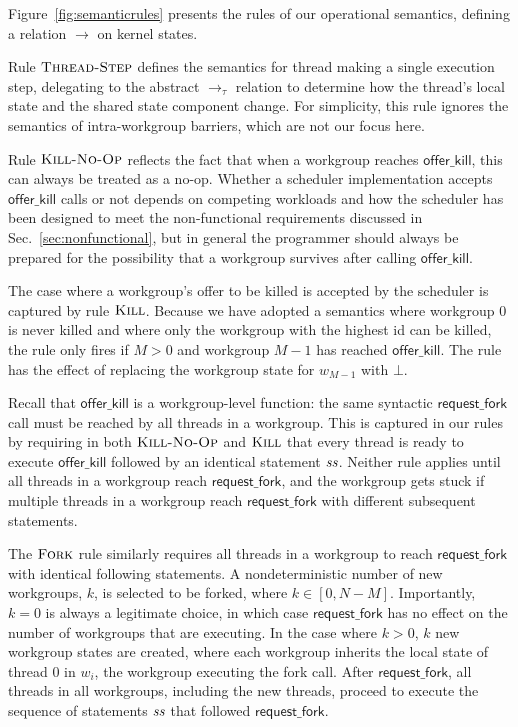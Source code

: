 \documentclass[parskip=half,sigconf,review, anonymous=true, acmcopyrightmode=none]{acmart}
\newcommand{\myfiglong}{Figure~}
\newcommand{\mysec}{Sec.~}
\newcommand{\offerfork}{\mathsf{request\_fork}}
\newcommand{\offerkill}{\mathsf{offer\_kill}}
\begin{document}
%
\myfiglong\ref{fig:semanticrules} presents the rules of our
operational semantics, defining a relation $\rightarrow$ on kernel
states.

Rule $\textsc{Thread-Step}$ defines the semantics for thread making a
single execution step, delegating to the abstract $\rightarrow_{\tau}$
relation to determine how the thread's local state and the shared
state component change.  For simplicity, this rule ignores the
semantics of intra-workgroup barriers, which are not our focus here.

Rule $\textsc{Kill-No-Op}$ reflects the fact that when a workgroup
reaches $\offerkill$, this can always be treated as a no-op.  Whether
a scheduler implementation accepts $\offerkill$ calls or not depends
on competing workloads and how the scheduler has been designed to meet
the non-functional requirements discussed in
\mysec\ref{sec:nonfunctional}, but in general the programmer should
always be prepared for the possibility that a workgroup survives after
calling $\offerkill$.

The case where a workgroup's offer to be killed is accepted by the
scheduler is captured by rule $\textsc{Kill}$.  Because we have
adopted a semantics where workgroup 0 is never killed and where only
the workgroup with the highest id can be killed, the rule only fires
if $M > 0$ and workgroup $M-1$ has reached $\offerkill$.  The rule has
the effect of replacing the workgroup state for $w_{M-1}$
with $\bot$.

Recall that $\offerkill$ is a workgroup-level function: the same
syntactic $\offerfork$ call must be reached by all threads in a
workgroup.  This is captured in our rules by requiring in both
$\textsc{Kill-No-Op}$ and $\textsc{Kill}$ that every thread is ready
to execute $\offerkill$ followed by an identical statement $\mathit{ss}$.
Neither rule applies until all threads in a workgroup reach
$\offerfork$, and the workgroup gets stuck if multiple threads in a
workgroup reach $\offerfork$ with different subsequent statements.

The $\textsc{Fork}$ rule similarly requires all threads in a workgroup
to reach $\offerfork$ with identical following statements.  A
nondeterministic number of new workgroups, $k$, is selected to be
forked, where $k \in [0, N-M]$.  Importantly, $k=0$ is always a
legitimate choice, in which case $\offerfork$ has no effect on the
number of workgroups that are executing.  In the case where $k > 0$,
$k$ new workgroup states are created, where each workgroup inherits
the local state of thread 0 in $w_i$, the workgroup executing the fork
call.  After $\offerfork$, all threads in all workgroups, including
the new threads, proceed to execute the sequence of statements $\mathit{ss}$
that followed $\offerfork$.
\end{document}
